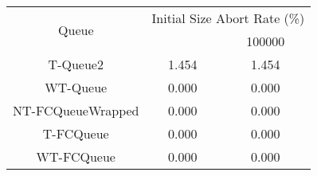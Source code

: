 \begin{tabular}{|c|c|c|}
\hline
\multirow{2}{*}{Queue} & \multicolumn{2}{c|}{Initial Size Abort Rate (\%)}\\\cline{2-3}& \quad 10000 \quad & 100000\\
\hline
\hline
T-Queue2 & 1.454 & 1.454\\
WT-Queue & 0.000 & 0.000\\
NT-FCQueueWrapped & 0.000 & 0.000\\
T-FCQueue & 0.000 & 0.000\\
WT-FCQueue & 0.000 & 0.000\\
\hline\end{tabular}
